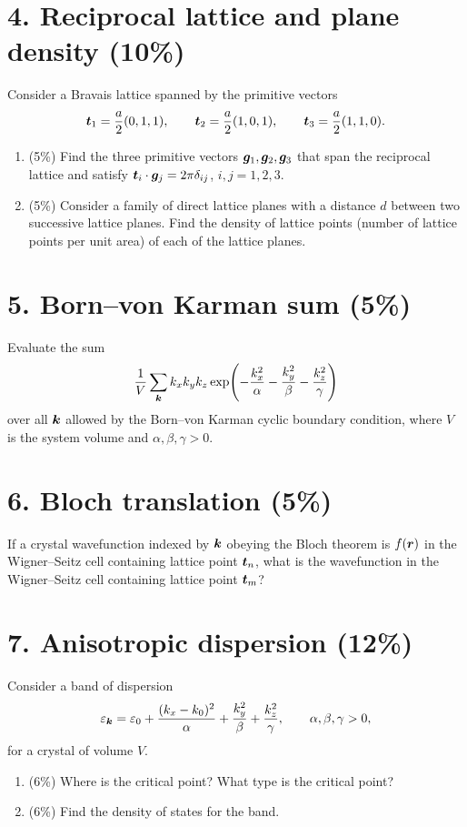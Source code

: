 \section*{4. Reciprocal lattice and plane density (10\%)}
Consider a Bravais lattice spanned by the primitive vectors
\[
\boldsymbol{t}_1=\frac a2(0,1,1),\qquad
\boldsymbol{t}_2=\frac a2(1,0,1),\qquad
\boldsymbol{t}_3=\frac a2(1,1,0).
\]
\begin{enumerate}[label=(\alph*)]
\item (5\%) Find the three primitive vectors $\boldsymbol{g}_1,\boldsymbol{g}_2,\boldsymbol{g}_3$ that span the reciprocal lattice and satisfy $\boldsymbol{t}_i\cdot\boldsymbol{g}_j=2\pi\delta_{ij}$, $i,j=1,2,3$.
\item (5\%) Consider a family of direct lattice planes with a distance $d$ between two successive lattice planes. Find the density of lattice points (number of lattice points per unit area) of each of the lattice planes.
\end{enumerate}

\section*{5. Born--von Karman sum (5\%)}
Evaluate the sum
\[
\frac1V\sum_{\boldsymbol{k}} k_x k_y k_z
\exp\!\left(-\frac{k_x^2}{\alpha}-\frac{k_y^2}{\beta}-\frac{k_z^2}{\gamma}\right)
\]
over all $\boldsymbol{k}$ allowed by the Born--von Karman cyclic boundary condition, where $V$ is the system volume and $\alpha,\beta,\gamma>0$.

\section*{6. Bloch translation (5\%)}
If a crystal wavefunction indexed by $\boldsymbol{k}$ obeying the Bloch theorem is $f(\boldsymbol{r})$ in the Wigner--Seitz cell containing lattice point $\boldsymbol{t}_n$, what is the wavefunction in the Wigner--Seitz cell containing lattice point $\boldsymbol{t}_m$?

\section*{7. Anisotropic dispersion (12\%)}
Consider a band of dispersion
\[
\varepsilon_{\boldsymbol{k}}=\varepsilon_0+
\frac{(k_x-k_0)^2}{\alpha}+\frac{k_y^2}{\beta}+\frac{k_z^2}{\gamma},
\qquad \alpha,\beta,\gamma>0,
\]
for a crystal of volume $V$.
\begin{enumerate}[label=(\alph*)]
\item (6\%) Where is the critical point? What type is the critical point?
\item (6\%) Find the density of states for the band.
\end{enumerate}

